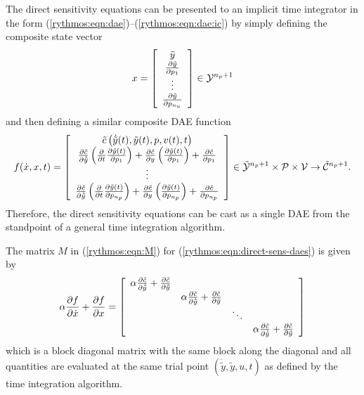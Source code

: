 \documentclass[pdf,ps2pdf,11pt]{SANDreport}
\begin{document}
The direct sensitivity equations can be presented to an implicit time
integrator in the form
(\ref{rythmos:eqn:dae})--(\ref{rythmos:eqn:dae:ic}) by simply
defining the composite state vector
%
\begin{equation}
x =
{\bmat{c}
\tilde{y} \\
\frac{\partial \tilde{y}}{\partial p_1} \\ \vdots \\ \frac{\partial \tilde{y}}{\partial p_{n_u}}
\emat}
\in \mathcal{Y}^{n_p+1}
\end{equation}
%
and then defining a similar composite DAE function
%
\begin{equation}
f(\dot{x},x,t) =
{\bmat{c}
%
\tilde{c}\left( \dot{\tilde{y}}(t), \tilde{y}(t), p, v(t), t \right) \\
%
\frac{\partial \tilde{c}}{\partial \dot{\tilde{y}}} \left(\frac{\partial}{\partial t} \frac{\partial \tilde{y}(t)}{\partial p_1} \right)
+ \frac{\partial \tilde{c}}{\partial y} \left(\frac{\partial \tilde{y}(t)}{\partial p_1}\right)
+ \frac{\partial \tilde{c}}{\partial p_1} \\
%
\vdots \\
%
\frac{\partial \tilde{c}}{\partial \dot{\tilde{y}}} \left(\frac{\partial}{\partial t} \frac{\partial \tilde{y}(t)}{\partial p_{n_p}} \right)
+ \frac{\partial \tilde{c}}{\partial y} \left(\frac{\partial \tilde{y}(t)}{\partial p_{n_p}}\right)
+ \frac{\partial \tilde{c}}{\partial p_{n_p}}
%
\emat}
\in \tilde{\mathcal{Y}}^{n_p+1} \times \mathcal{P} \times \mathcal{V} \rightarrow \tilde{\mathcal{C}}^{n_p+1}.
\label{rythmos:eqn:direct-sens-daes}
\end{equation}
%
Therefore, the direct sensitivity equations can be cast as a single DAE from
the standpoint of a general time integration algorithm.

The matrix $M$ in (\ref{rythmos:eqn:M}) for
(\ref{rythmos:eqn:direct-sens-daes}) is given by
%
\begin{equation}
\alpha \frac{\partial f}{\partial \dot{x}} + \frac{\partial f}{\partial x} = 
{\bmat{cccc}
\alpha \frac{\partial \tilde{c}}{\partial \dot{\tilde{y}}} + \frac{\partial \tilde{c}}{\partial \tilde{y}} \\
& \alpha \frac{\partial \tilde{c}}{\partial \dot{\tilde{y}}} + \frac{\partial \tilde{c}}{\partial \tilde{y}} \\
& & \ddots \\
& & & \alpha \frac{\partial \tilde{c}}{\partial \dot{\tilde{y}}} + \frac{\partial \tilde{c}}{\partial \tilde{y}}
\emat}
\label{rythmos:eqn:direct-sens-daes-jac}
\end{equation}
%
which is a block diagonal matrix with the same block along the diagonal and
all quantities are evaluated at the same trial point
$(\dot{\tilde{y}},\tilde{y},u,t)$ as defined by the time integration
algorithm.
\end{document}
